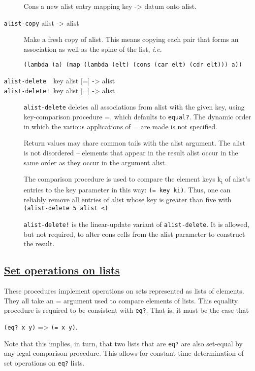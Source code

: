 \begin{description}
Cons a new alist entry mapping key -\textgreater{} datum onto alist.
\item[ \href{}{} \texttt{alist-copy} alist -\textgreater{} alist ]
Make a fresh copy of alist. This means copying each pair that forms an
association as well as the spine of the list, \emph{i.e.}

\begin{verbatim}
(lambda (a) (map (lambda (elt) (cons (car elt) (cdr elt))) a))
\end{verbatim}
\item[ \href{}{} \texttt{alist-delete~~}key alist {[}={]}
-\textgreater{} alist\\
\href{}{} \texttt{alist-delete!~}key alist {[}={]} -\textgreater{} alist
]
\texttt{alist-delete} deletes all associations from alist with the given
key, using key-comparison procedure =, which defaults to
\texttt{equal?}. The dynamic order in which the various applications of
= are made is not specified.

Return values may share common tails with the alist argument. The alist
is not disordered -- elements that appear in the result alist occur in
the same order as they occur in the argument alist.

The comparison procedure is used to compare the element keys
k\textsubscript{i} of alist's entries to the key parameter in this way:
\texttt{(=\ key\ ki)}. Thus, one can reliably remove all entries of
alist whose key is greater than five with
\texttt{(alist-delete\ 5\ alist\ \textless{})}

\texttt{alist-delete!} is the linear-update variant of
\texttt{alist-delete}. It is allowed, but not required, to alter cons
cells from the alist parameter to construct the result.
\end{description}

\subsection{\texorpdfstring{\href{}{Set operations on
lists}}{Set operations on lists}}\label{set-operations-on-lists}

These procedures implement operations on sets represented as lists of
elements. They all take an = argument used to compare elements of lists.
This equality procedure is required to be consistent with \texttt{eq?}.
That is, it must be the case that

\texttt{(eq?\ x\ y)} =\textgreater{} \texttt{(=\ x\ y)}.

Note that this implies, in turn, that two lists that are \texttt{eq?}
are also set-equal by any legal comparison procedure. This allows for
constant-time determination of set operations on \texttt{eq?} lists.

